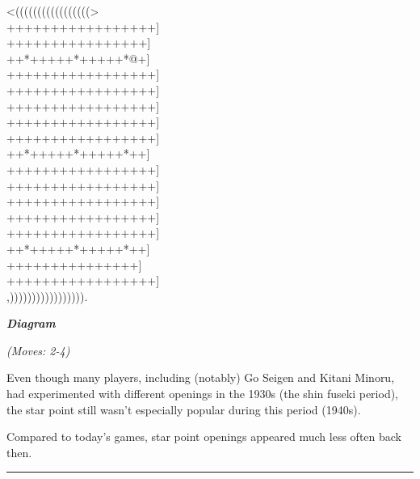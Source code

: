 \documentclass[letterpaper,12pt]{memoir}
\newcounter{GoFigure}[part]
\newcommand{\gofigure}{%
 \stepcounter{GoFigure}
 \centerline{\textit{\textbf{Diagram \arabic{GoFigure}}}}
}
\newcommand{\subtext}[1]{\centerline{\textit{#1}}}
\begin{document}
\begin{minipage}[t]{240pt}
\label{Fujisawa-Hosai-vs-Go-Seigen-19430225:0:mainmove-2}
{\gnos
<(((((((((((((((((>\\
+++++++++++++++++]\\
++++++++++++++++]\\
++*+++++*+++++*@+]\\
+++++++++++++++++]\\
+++++++++++++++++]\\
+++++++++++++++++]\\
+++++++++++++++++]\\
+++++++++++++++++]\\
++*+++++*+++++*++]\\
+++++++++++++++++]\\
+++++++++++++++++]\\
+++++++++++++++++]\\
+++++++++++++++++]\\
+++++++++++++++++]\\
++*+++++*+++++*++]\\
+++++++++++++++]\\
+++++++++++++++++]\\
,))))))))))))))))).\\
}
\gofigure
\subtext{(Moves: 2-4)}
\end{minipage}
\begin{minipage}[t]{115.19999999999999pt}
\setlength{\parskip}{0.5em}
Even though many players, including (notably) Go Seigen and Kitani Minoru, had experimented with different openings in the 1930s (the shin fuseki period), the star point still wasn't especially popular during this period (1940s).

Compared to today's games, star point openings appeared much less often back then.


\end{minipage}
\vfill

\rule{\textwidth}{0.5pt}
\end{document}
